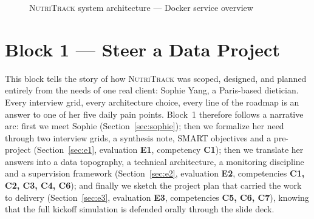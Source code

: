 \documentclass[a4paper,11pt,oneside,openany]{report}
\newcommand{\competence}[1]{\textbf{\textcolor{ntgreen}{#1}}}
\newcommand{\evaluation}[1]{\textbf{\textcolor{ntblue}{#1}}}
\newcommand{\nutritrack}{\textsc{NutriTrack}}
\begin{document}
\begin{figure}[H]
{%
}
\caption{\nutritrack{} system architecture --- Docker service overview}
\label{fig:arch-system}
\end{figure}


\chapter{Block 1 --- Steer a Data Project}
\label{ch:bloc1}

This block tells the story of how \nutritrack{} was scoped, designed,
and planned entirely from the needs of one real client: Sophie Yang, a
Paris-based dietician. Every interview grid, every architecture choice,
every line of the roadmap is an answer to one of her five daily pain
points. Block~1 therefore follows a narrative arc: first we meet
Sophie (Section~\ref{sec:sophie}); then we formalize her need through
two interview grids, a synthesis note, SMART objectives and a
pre-project (Section~\ref{sec:e1}, evaluation \evaluation{E1},
competency \competence{C1}); then we translate her answers into a
data topography, a technical architecture, a monitoring discipline
and a supervision framework (Section~\ref{sec:e2}, evaluation
\evaluation{E2}, competencies \competence{C1, C2, C3, C4, C6}); and
finally we sketch the project plan that carried the work to delivery
(Section~\ref{sec:e3}, evaluation \evaluation{E3}, competencies
\competence{C5, C6, C7}), knowing that the full kickoff simulation is
defended orally through the slide deck.
\end{document}
